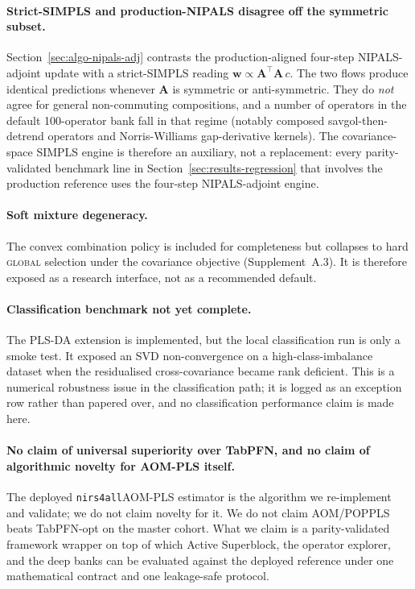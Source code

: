 \documentclass[review,a4paper]{elsarticle}
\newcommand{\Amat}{\mathbf{A}}
\newcommand{\wvec}{\mathbf{w}}
\newcommand{\AOM}{\textsc{AOM}\xspace}
\newcommand{\POP}{\textsc{POP}\xspace}
\newcommand{\PLS}{\textsc{PLS}\xspace}
\newcommand{\PLSDA}{\textsc{PLS-DA}\xspace}
\newcommand{\NIPALS}{\textsc{NIPALS}\xspace}
\newcommand{\SIMPLS}{\textsc{SIMPLS}\xspace}
\newcommand{\nirsfourall}{\texttt{nirs4all}\xspace}
\begin{document}
\paragraph{Strict-\SIMPLS and production-\NIPALS disagree off the
symmetric subset.}
Section~\ref{sec:algo-nipals-adj} contrasts the production-aligned
four-step \NIPALS-adjoint update with a strict-\SIMPLS reading
$\wvec\propto\Amat^\top\Amat\,c$. The two flows produce identical
predictions whenever $\Amat$ is symmetric or anti-symmetric. They do
\emph{not} agree for general non-commuting compositions, and a number
of operators in the default 100-operator bank fall in that regime
(notably composed savgol-then-detrend operators and Norris-Williams
gap-derivative kernels). The covariance-space \SIMPLS engine is
therefore an auxiliary, not a replacement: every parity-validated
benchmark line in Section~\ref{sec:results-regression} that involves
the production reference uses the four-step \NIPALS-adjoint engine.

\paragraph{Soft mixture degeneracy.}
The convex combination policy is included for completeness but
collapses to hard \textsc{global} selection under the covariance
objective (Supplement~A.3). It is therefore exposed as a research
interface, not as a recommended default.

\paragraph{Classification benchmark not yet complete.}
The \PLSDA extension is implemented, but the local classification run
is only a smoke test. It exposed an SVD non-convergence on a
high-class-imbalance dataset when the residualised cross-covariance
became rank deficient. This is a numerical robustness issue in the
classification path; it is logged as an exception row rather than
papered over, and no classification performance claim is made here.

\paragraph{No claim of universal superiority over TabPFN, and no
claim of algorithmic novelty for \AOM-\PLS itself.}
The deployed \nirsfourall \AOM-\PLS estimator is the algorithm we
re-implement and validate; we do not claim novelty for it. We do not
claim \AOM/\POP \PLS beats TabPFN-opt on the master cohort. What we
claim is a parity-validated framework wrapper on top of which Active
Superblock, the operator explorer, and the deep banks can be evaluated
against the deployed reference under one mathematical contract and one
leakage-safe protocol.
\end{document}
